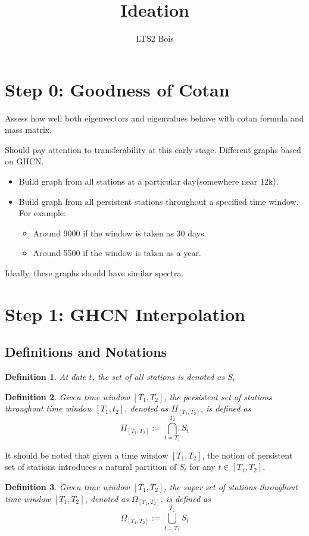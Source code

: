 \documentclass[12pt]{article}
\newtheorem{definition}{Definition}
\begin{document}
 
\title{Ideation}
\author{LTS2 Bois} 
\maketitle

\section{Step 0: Goodness of Cotan}
Assess how well both eigenvectors and eigenvalues behave with cotan formula and mass matrix. 

Should pay attention to transferability at this early stage. Different graphs based on GHCN.
\begin{itemize}
    \item Build graph from all stations at a particular day(somewhere near 12k).
    \item Build graph from all persistent stations throughout a specified time window. \\For example:
    \begin{itemize}
        \item Around 9000 if the window is taken as 30 days. 
        \item Around 5500 if the window is taken as a year. 
    \end{itemize}
\end{itemize}
Ideally, these graphs should have similar spectra. 

\section{Step 1: GHCN Interpolation}
\subsection{Definitions and Notations}
\begin{definition}
    At date $t$, the set of all stations is denoted as $S_t$
\end{definition}
\begin{definition}
    Given time window $[T_1, T_2]$, the persistent set of stations throughout time window $[T_1, t_2]$, denoted as $\Pi_{[T_1, T_2]}$, is defined as
    \[\Pi_{[T_1, T_2]} := \bigcap_{t=T_1}^{T_2} S_t\]
\end{definition}
It should be noted that given a time window $[T_1, T_2]$, the notion of persistent set of stations introduces a natural partition of $S_t$ for any $t\in [T_1, T_2]$. 
\begin{definition}
    Given time window $[T_1, T_2]$, the super set of stations throughout time window $[T_1, T_2]$, denoted as $\Omega_{[T_1, T_2]}$, is defined as
    \[\Omega_{[T_1, T_2]} := \bigcup_{t=T_1}^{T_2} S_t\]
\end{definition}
\end{document}
